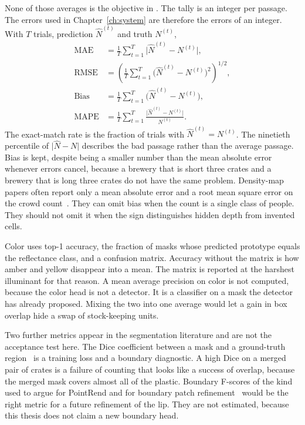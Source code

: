None of those averages is the objective in . The tally is an integer per passage. The errors used in Chapter~\ref{ch:system} are therefore the errors of an integer. With $T$ trials, prediction $\hat{N}^{(t)}$ and truth $N^{(t)}$,
\begin{equation}
\begin{aligned}
\mathrm{MAE}
&= \frac{1}{T}\sum_{t=1}^{T}\lvert\hat{N}^{(t)}-N^{(t)}\rvert,\\
\mathrm{RMSE}
&= \left(\frac{1}{T}\sum_{t=1}^{T}\big(\hat{N}^{(t)}-N^{(t)}\big)^{2}\right)^{1/2},\\
\mathrm{Bias}
&= \frac{1}{T}\sum_{t=1}^{T}\big(\hat{N}^{(t)}-N^{(t)}\big),\\
\mathrm{MAPE}
&= \frac{1}{T}\sum_{t=1}^{T}\frac{\lvert\hat{N}^{(t)}-N^{(t)}\rvert}{N^{(t)}}.
\end{aligned}
\label{eq:count-metrics}
\end{equation}
The exact-match rate is the fraction of trials with $\hat{N}^{(t)}=N^{(t)}$. The ninetieth percentile of $\lvert\hat{N}-N\rvert$ describes the bad passage rather than the average passage. Bias is kept, despite being a smaller number than the mean absolute error whenever errors cancel, because a brewery that is short three crates and a brewery that is long three crates do not have the same problem. Density-map papers often report only a mean absolute error and a root mean square error on the crowd count~\cite{li2018csrnet,wang2020dmcount}. They can omit bias when the count is a single class of people. They should not omit it when the sign distinguishes hidden depth from invented cells.

Color uses top-1 accuracy, the fraction of masks whose predicted prototype equals the reflectance class, and a confusion matrix. Accuracy without the matrix is how amber and yellow disappear into a mean. The matrix is reported at the harshest illuminant for that reason. A mean average precision on color is not computed, because the color head is not a detector. It is a classifier on a mask the detector has already proposed. Mixing the two into one average would let a gain in box overlap hide a swap of stock-keeping units.

Two further metrics appear in the segmentation literature and are not the acceptance test here. The Dice coefficient between a mask and a ground-truth region~\cite{dice1945,milletari2016vnet} is a training loss and a boundary diagnostic. A high Dice on a merged pair of crates is a failure of counting that looks like a success of overlap, because the merged mask covers almost all of the plastic. Boundary F-scores of the kind used to argue for PointRend and for boundary patch refinement~\cite{kirillov2020pointrend,tang2021bpr} would be the right metric for a future refinement of the lip. They are not estimated, because this thesis does not claim a new boundary head.


